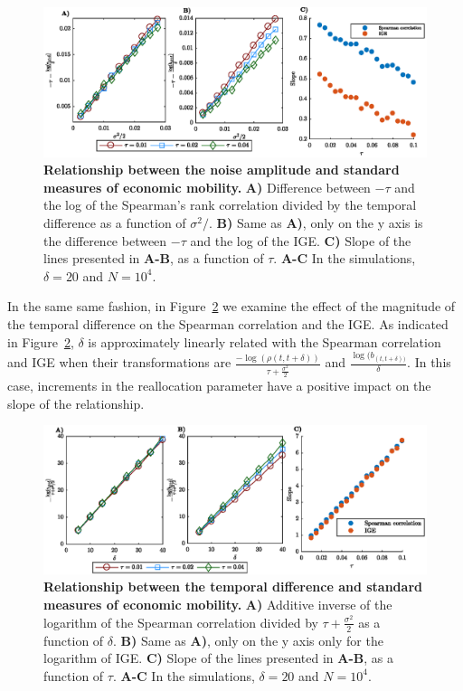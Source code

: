 \documentclass[11pt]{article}
\newcommand{\Fref}[1]{Figure~\ref{fig:#1}}
\numberwithin{equation}{section}
\begin{document}
\begin{figure}[!htb]
\centering
\includegraphics[width=1.0\textwidth]{figs/fig_rgbm_sigma_relationship.eps}
\caption{\textbf{Relationship between the noise amplitude and standard measures of economic mobility.} \textbf{A)} Difference between $-\tau$ and the log of the Spearman's rank correlation divided by the temporal difference as a function of $\sigma^2/$. \textbf{B)} Same as \textbf{A)}, only on the y axis is the difference between $-\tau$ and the log of the IGE. \textbf{C)} Slope of the lines presented in \textbf{A-B}, as a function of $\tau$. 
\textbf{A-C} In the simulations, $\delta = 20$ and $N = 10^4$.
\label{fig:rgbm-standard-measures-sigma}}
\end{figure}
\FloatBarrier

In the same same fashion, in \Fref{rgbm-standard-measures-delta} we examine the effect of the magnitude of the temporal difference on the Spearman correlation and the IGE. As indicated in \Fref{rgbm-standard-measures-delta}, $\delta$ is approximately linearly related with the Spearman correlation and IGE when their transformations are $\frac{-\log(\rho(t,t+\delta))}{\tau + \frac{\sigma^2}{2}}$ and $\frac{\log(b_{(t,t+\delta))}}{\delta}$. In this case, increments in the reallocation parameter have a positive impact on the slope of the relationship.

\begin{figure}[!htb]
\centering
\includegraphics[width=1.0\textwidth]{figs/fig_rgbm_delta_relationship.eps}
\caption{\textbf{Relationship between the temporal difference and standard measures of economic mobility.} \textbf{A)} Additive inverse of the logarithm of the Spearman correlation divided by $\tau +\frac{\sigma^2}{2}$ as a function of $\delta$. \textbf{B)} Same as \textbf{A)}, only on the y axis only for the logarithm of IGE. \textbf{C)} Slope of the lines presented in \textbf{A-B}, as a function of $\tau$. 
\textbf{A-C} In the simulations, $\delta = 20$ and $N = 10^4$.
\label{fig:rgbm-standard-measures-delta}}
\end{figure}
\FloatBarrier
\end{document}
